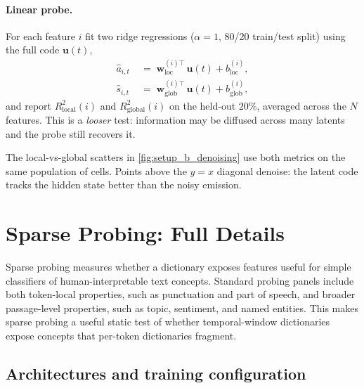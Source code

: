 \paragraph{Linear probe.} For each feature $i$ fit two ridge regressions ($\alpha = 1$, 80/20 train/test split) using the full code $\mathbf{u}(t)$,
\begin{align*}
    \hat a_{i,t} &\;=\; \mathbf{w}^{(i)\top}_{\mathrm{loc}}\, \mathbf{u}(t) + b^{(i)}_{\mathrm{loc}}, \\
    \hat s_{i,t} &\;=\; \mathbf{w}^{(i)\top}_{\mathrm{glob}}\, \mathbf{u}(t) + b^{(i)}_{\mathrm{glob}},
\end{align*}
and report $R^2_{\mathrm{local}}(i)$ and $R^2_{\mathrm{global}}(i)$ on the held-out $20\%$, averaged across the $N$ features. This is a \emph{looser} test: information may be diffused across many latents and the probe still recovers it.

The local-vs-global scatters in \cref{fig:setup_b_denoising} use both metrics on the same population of cells. Points above the $y = x$ diagonal denoise: the latent code tracks the hidden state better than the noisy emission.


\section{Sparse Probing: Full Details}
\label{app:c3}

Sparse probing measures whether a dictionary exposes features useful for simple classifiers of human-interpretable text concepts. Standard probing panels include both token-local properties, such as punctuation and part of speech, and broader passage-level properties, such as topic, sentiment, and named entities. This makes sparse probing a useful static test of whether temporal-window dictionaries expose concepts that per-token dictionaries fragment.

\subsection{Architectures and training configuration}
\label{app:c3-archs}

